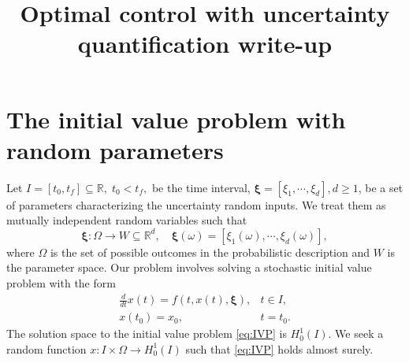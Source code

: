 \documentclass[final,3p,times,11pt]{elsarticle}
\begin{document}
\begin{frontmatter}
\title{Optimal control with uncertainty quantification write-up}
\end{frontmatter}




\section{The initial value problem with random parameters}\label{sec:Problem_setup}
Let $I = [t_0,t_f]\subseteq \mathbb{R}, \;t_0<t_f,$ be the time interval, $\boldsymbol{\xi}=[\xi_1,\cdots, \xi_{d}], d\ge1$, be a set of parameters characterizing the uncertainty random inputs. We treat them as mutually independent random variables such that
\[
\boldsymbol{\xi}:\Omega\rightarrow W \subseteq \mathbb{R}^d, \quad \boldsymbol{\xi}(\omega) =  \left[\xi_1(\omega),\cdots, \xi_{d}(\omega) \right],
\]
where $\Omega$ is the set of possible outcomes in the probabilistic description and $W$ is the parameter space. 
Our problem involves solving a stochastic initial value problem with the form
\begin{equation}\label{eq:IVP}
    \begin{array}{ll}
        \displaystyle\frac{d}{dt}x(t) = f \left(t,x(t),\boldsymbol{\xi} \right),&t\in I,\\[6pt]
        \displaystyle x(t_0) = x_0, & t=t_0.
    \end{array}
\end{equation}
The solution space to the initial value problem \eqref{eq:IVP} is $H_0^1(I)$.  We seek a random function $x: I\times \Omega\rightarrow H_0^1(I)$ such that \eqref{eq:IVP} holds almost surely. 

\end{document}
